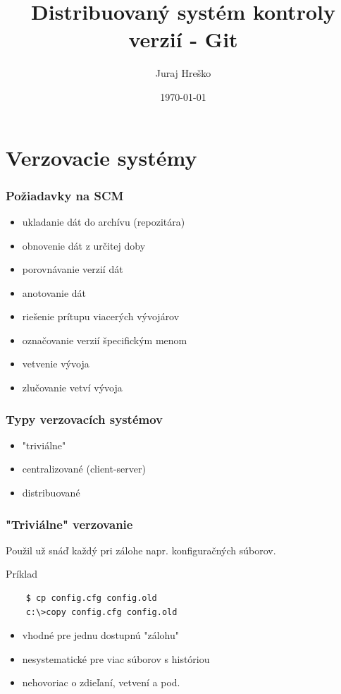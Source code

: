 \documentclass[red]{beamer}
\title{Distribuovaný systém kontroly verzií - Git}    %
\author{Juraj Hreško}                 %
\institute{ecommerce.cz}      %
\date{\today}                    %
\begin{document}
\begin{frame}
  \titlepage
\end{frame}


\section{Verzovacie systémy}



\begin{frame}
  \frametitle{Požiadavky na SCM}   %
  \begin{itemize}
  \item ukladanie dát do archívu (repozitára)
\pause
  \item obnovenie dát z určitej doby
\pause
  \item porovnávanie verzií dát
\pause
  \item anotovanie dát
\pause
  \item riešenie prítupu viacerých vývojárov
\pause
 \item označovanie verzií špecifickým menom
\pause
 \item vetvenie vývoja
\pause
 \item zlučovanie vetví vývoja
  \end{itemize}
\end{frame}

\begin{frame}
  \frametitle{Typy verzovacích systémov}   %
  \begin{itemize}
  \item "triviálne"
  \item centralizované (client-server)
  \item distribuované
  \end{itemize}
\end{frame}

\begin{frame}[fragile]
  \frametitle{"Triviálne"  verzovanie}   %
   
  Použil už snáď každý pri zálohe napr. konfiguračných súborov. 

\begin{block}{Príklad}
\begin{verbatim}
    $ cp config.cfg config.old
    c:\>copy config.cfg config.old
\end{verbatim}
\end{block}
\pause
\begin{itemize}
\item vhodné pre jednu dostupnú "zálohu"
\item nesystematické pre viac súborov s históriou
\item nehovoriac o zdieľaní, vetvení a pod.
\end{itemize}

\end{frame}
\end{document}
